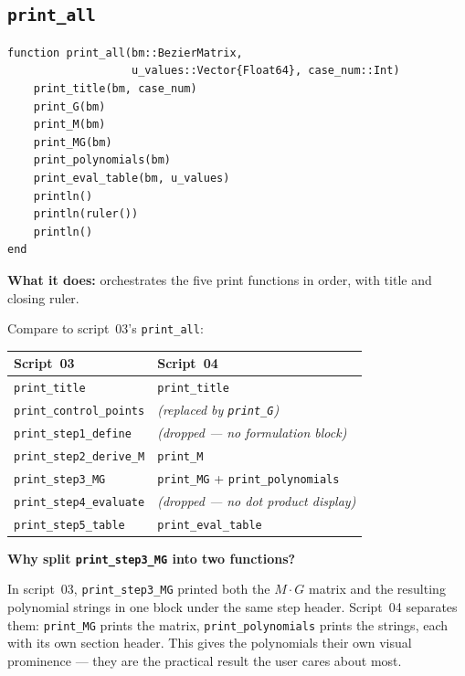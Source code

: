 \documentclass[12pt, a4paper]{article}
\newcommand{\cd}[1]{\texttt{#1}}
\begin{document}
\subsection{\texttt{print\_all}}

\begin{verbatim}
function print_all(bm::BezierMatrix,
                   u_values::Vector{Float64}, case_num::Int)
    print_title(bm, case_num)
    print_G(bm)
    print_M(bm)
    print_MG(bm)
    print_polynomials(bm)
    print_eval_table(bm, u_values)
    println()
    println(ruler())
    println()
end
\end{verbatim}

\textbf{What it does:} orchestrates the five print functions
in order, with title and closing ruler.

Compare to script~03's \cd{print\_all}:

\begin{center}
\begin{tabular}{ll}
\toprule
Script~03 & Script~04 \\
\midrule
\cd{print\_title} & \cd{print\_title} \\
\cd{print\_control\_points} & \textit{(replaced by \cd{print\_G})} \\
\cd{print\_step1\_define} & \textit{(dropped --- no formulation block)} \\
\cd{print\_step2\_derive\_M} & \cd{print\_M} \\
\cd{print\_step3\_MG} & \cd{print\_MG} + \cd{print\_polynomials} \\
\cd{print\_step4\_evaluate} & \textit{(dropped --- no dot product display)} \\
\cd{print\_step5\_table} & \cd{print\_eval\_table} \\
\bottomrule
\end{tabular}
\end{center}

\begin{notebox}
\textbf{Why split \cd{print\_step3\_MG} into two functions?}

In script~03, \cd{print\_step3\_MG} printed both the
$M \cdot G$ matrix and the resulting polynomial strings
in one block under the same step header.
Script~04 separates them: \cd{print\_MG} prints the matrix,
\cd{print\_polynomials} prints the strings, each with its
own section header.
This gives the polynomials their own visual prominence ---
they are the practical result the user cares about most.
\end{notebox}
\end{document}

